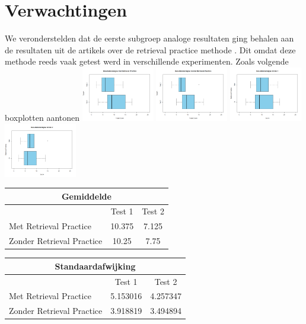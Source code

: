 \documentclass{hogent-article}
\begin{document}
	\section{Verwachtingen} %
	We veronderstelden dat de eerste subgroep analoge resultaten ging behalen aan de resultaten uit de artikels over de retrieval practice methode \autocite{butler2010repeated, pyc2012test, karpicke2007repeated, karpicke2008critical}. Dit omdat deze methode reeds vaak getest werd in verschillende experimenten. Zoals volgende boxplotten aantonen
	\includegraphics[width=120px]{Verwacht_RetrievalPractice}
	\includegraphics[width=120px]{Verwacht_ZonderRetrievalPractice}
	\includegraphics[width=120px]{Verwacht_RT_Score1}
	\includegraphics[width=120px]{Verwacht_RT_Score2}
	
	\begin{tabular}{ |p{10em}|c|c| }
	\hline
		\multicolumn{3}{|c|}{Gemiddelde} \\
	\hline
		& Test 1 & Test 2 \\
	\hline
		Met Retrieval Practice & 10.375 & 7.125 \\
		Zonder Retrieval Practice & 10.25 & 7.75 \\
	\hline
	\end{tabular}
	
	\begin{tabular}{ |p{10em}|c|c| }
	\hline
		\multicolumn{3}{|c|}{Standaardafwijking} \\
	\hline
		& Test 1 & Test 2 \\
	\hline
		Met Retrieval Practice & 5.153016 & 4.257347 \\
		Zonder Retrieval Practice & 3.918819 & 3.494894 \\
	\hline
	\end{tabular}
	
\end{document}
